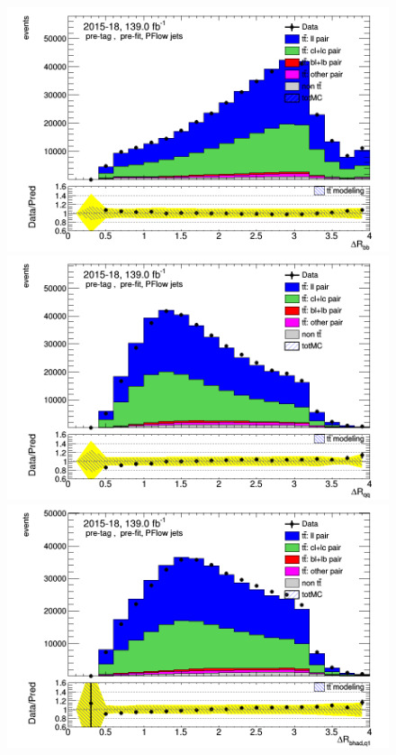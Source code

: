 \documentclass[letterpaper,12pt]{article}
\begin{document}
	
	\begin{figure}
	\begin{minipage}[b]{.45\textwidth}
	\centering
	\includegraphics[width=1\textwidth]{Oct_distributions/pretagNoRwDL1rwithhighpTPFlow_scaledall/DataMC_dRbb.png}
	\end{minipage}\hfill
	\begin{minipage}[b]{.45\textwidth}
	\centering
	\includegraphics[width=1\textwidth]{Oct_distributions/pretagNoRwDL1rwithhighpTPFlow_scaledall/DataMC_dRqq.png}
	\end{minipage}\hfill
	\begin{minipage}[b]{.45\textwidth}
	\centering
	\includegraphics[width=1\textwidth]{Oct_distributions/pretagNoRwDL1rwithhighpTPFlow_scaledall/DataMC_dRbhadq1.png}

\end{minipage}
\end{figure}
\end{document}
